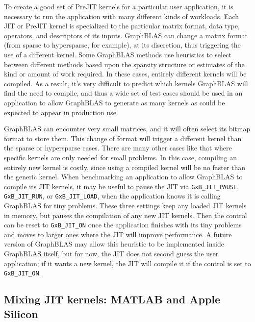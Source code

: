 To create a good set of PreJIT kernels for a particular user application, it is
necessary to run the application with many different kinds of workloads.  Each
JIT or PreJIT kernel is specialized to the particular matrix format, data type,
operators, and descriptors of its inputs.  GraphBLAS can change a matrix format
(from sparse to hypersparse, for example), at its discretion, thus triggering
the use of a different kernel.  Some GraphBLAS methods use heuristics to select
between different methods based upon the sparsity structure or estimates of the
kind or amount of work required.  In these cases, entirely different kernels
will be compiled.  As a result, it's very difficult to predict which kernels
GraphBLAS will find the need to compile, and thus a wide set of test cases
should be used in an application to allow GraphBLAS to generate as many kernels
as could be expected to appear in production use.

GraphBLAS can encounter very small matrices, and it will often select its
bitmap format to store them.  This change of format will trigger a different
kernel than the sparse or hypersparse cases.  There are many other cases like
that where specific kernels are only needed for small problems.  In this case,
compiling an entirely new kernel is costly, since using a compiled kernel will
be no faster than the generic kernel.  When benchmarking an application to
allow GraphBLAS to compile its JIT kernels, it may be useful to pause the JIT
via \verb'GxB_JIT_PAUSE', \verb'GxB_JIT_RUN', or \verb'GxB_JIT_LOAD', when the
application knows it is calling GraphBLAS for tiny problems.  These three
settings keep any loaded JIT kernels in memory, but pauses the compilation of
any new JIT kernels.  Then the control can be reset to \verb'GxB_JIT_ON' once
the application finishes with its tiny problems and moves to larger ones where
the JIT will improve performance.  A future version of GraphBLAS may allow
this heuristic to be implemented inside GraphBLAS itself, but for now, the
JIT does not second guess the user application; if it wants a new kernel,
the JIT will compile it if the control is set to \verb'GxB_JIT_ON'.

\subsection{Mixing JIT kernels: MATLAB and Apple Silicon}


